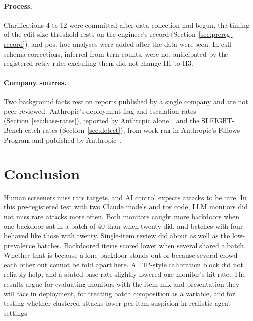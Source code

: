 \documentclass[11pt]{article}
\begin{document}
\paragraph{Process.} Clarifications 4 to 12 were committed after data collection had begun, the timing of the edit-size threshold rests on the engineer's record (Section~\ref{sec:prereg-record}), and post hoc analyses were added after the data were seen. In-call schema corrections, inferred from turn counts, were not anticipated by the registered retry rule; excluding them did not change H1 to H3.

\paragraph{Company sources.} Two background facts rest on reports published by a single company and are not peer reviewed: Anthropic's deployment flag and escalation rates (Section~\ref{sec:base-rates}), reported by Anthropic alone~\cite{favaro_pace}, and the SLEIGHT-Bench catch rates (Section~\ref{sec:detect}), from work run in Anthropic's Fellows Program and published by Anthropic~\cite{najt2026,najt2026arxiv}.

\section{Conclusion}\label{sec:conclusion}

Human screeners miss rare targets, and AI control expects attacks to be rare. In this pre-registered test with two Claude models and toy code, LLM monitors did not miss rare attacks more often. Both monitors caught more backdoors when one backdoor sat in a batch of 40 than when twenty did, and batches with four behaved like those with twenty. Single-item review did about as well as the low-prevalence batches. Backdoored items scored lower when several shared a batch. Whether that is because a lone backdoor stands out or because several crowd each other out cannot be told apart here. A TIP-style calibration block did not reliably help, and a stated base rate slightly lowered one monitor's hit rate. The results argue for evaluating monitors with the item mix and presentation they will face in deployment, for treating batch composition as a variable, and for testing whether clustered attacks lower per-item suspicion in realistic agent settings.

\end{document}
